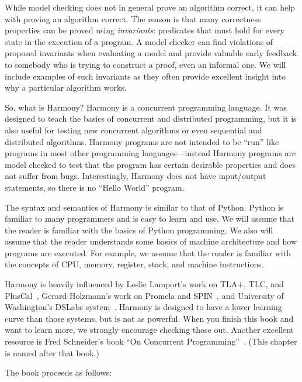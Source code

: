 \documentclass{report}
\begin{document}
%

While model checking does not in general prove an algorithm correct,
it can help with proving an algorithm correct.
The reason is that many correctness properties can be proved using
\emph{invariants}:
%
predicates that must hold for every state in the
execution of a program.  A model checker can find violations of
proposed invariants when evaluating a model and provide valuable early
feedback to somebody who is trying to construct a proof, even an
informal one.
We will include examples
of such invariants as they often provide excellent insight into
why a particular algorithm works.

So, what is Harmony?
Harmony is a concurrent programming language.  It was designed to teach
the basics of concurrent and distributed programming, but it is also useful for
testing new concurrent algorithms or even sequential and distributed
algorithms.  Harmony programs are not intended to be ``run'' like programs
in most other programming languages---instead Harmony programs are
model checked to test that the program has certain desirable
properties and does not suffer from bugs.
Interestingly, Harmony does not have input/output statements, so there is
no ``Hello World'' program.

The syntax and semantics of Harmony is similar to that of Python.
Python is familiar to many programmers and is easy to learn and
use.  We will assume that the reader is familiar with the basics
of Python programming.  We also will assume that the reader
understands some basics of machine architecture and how programs
are executed.  For example, we assume that the reader is familiar
with the concepts of CPU, memory, register, stack, and machine
instructions.

Harmony is heavily influenced by Leslie Lamport's work on
TLA+, TLC, and PlusCal~\cite{Lamport02, Lamport09},
Gerard Holzmann's work on Promela and SPIN~\cite{SPIN},
and University of Washington's DSLabs system~\cite{MWA19}.
Harmony is designed to have a lower learning curve than those
systems, but is not as powerful.  When you finish this book
and want to learn more, we strongly encourage checking
those out.
Another excellent resource is Fred Schneider's book ``On
Concurrent Programming''~\cite{Schneider97}.
(This chapter is named after that book.)

The book proceeds as follows:
\end{document}
